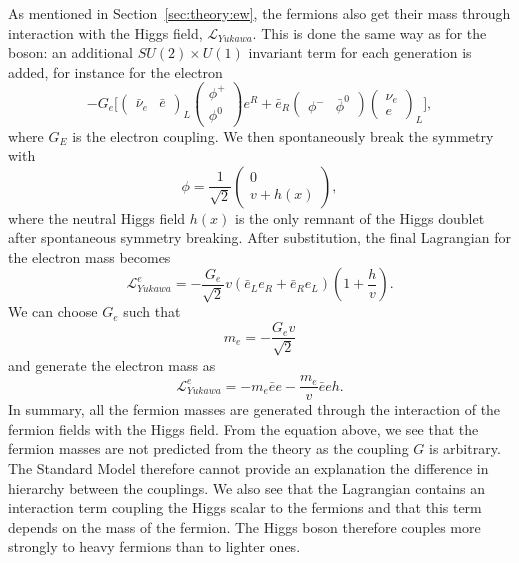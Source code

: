 As mentioned in Section~\ref{sec:theory:ew}, the fermions also get their mass through interaction with the Higgs field, $\mathcal{L}_{Yukawa}$. This is done the same way as for the boson: an additional $SU(2) \times U(1)$ invariant term for each generation is added, for instance for the electron
\begin{equation}
  -G_e \bigg[ \begin{pmatrix} \bar{\nu}_e & \bar{e}\end{pmatrix}_L   \begin{pmatrix} \phi^{+} \\ \phi^{0} \end{pmatrix} e^R +
  \bar{e}_R  \begin{pmatrix} \phi^{-} & \bar{\phi}^{0} \end{pmatrix}  \begin{pmatrix} \nu_e \\ e\end{pmatrix}_L  \bigg],
  \end{equation}
where $G_E$ is the electron coupling. We then spontaneously break the symmetry with
\begin{equation}
\phi = \frac{1}{\sqrt{2}}  \begin{pmatrix} 0 \\ v+h(x) \end{pmatrix},
\end{equation}
 where the neutral Higgs field $h(x)$ is the only remnant of the Higgs doublet after spontaneous symmetry breaking. After substitution, the final Lagrangian for the electron mass becomes
 \begin{equation}
   \mathcal{L}_{Yukawa}^e=-\frac{G_e}{\sqrt{2}}v(\bar{e}_L e_R + \bar{e}_R e_L )(1+\frac{h}{v}).
\end{equation}
We can choose $G_e$ such that
\begin{equation}
  m_e=-\frac{G_e v}{\sqrt{2}}
  \end{equation}
and generate the electron mass as
\begin{equation}
  \mathcal{L}_{Yukawa}^e=-m_e \bar{e}e-\frac{m_e}{v} \bar{e}eh.
\end{equation}  
In summary, all the fermion masses are generated through the interaction of the fermion fields with the Higgs field. From the equation above, we see that the fermion masses are not predicted from the theory as the coupling $G$ is arbitrary. The Standard Model therefore cannot provide an explanation the difference in hierarchy between the couplings. We also see that the Lagrangian contains an interaction term coupling the Higgs scalar to the fermions and that this term depends on the mass of the fermion. The Higgs boson therefore couples more strongly to heavy fermions than to lighter ones.
     
